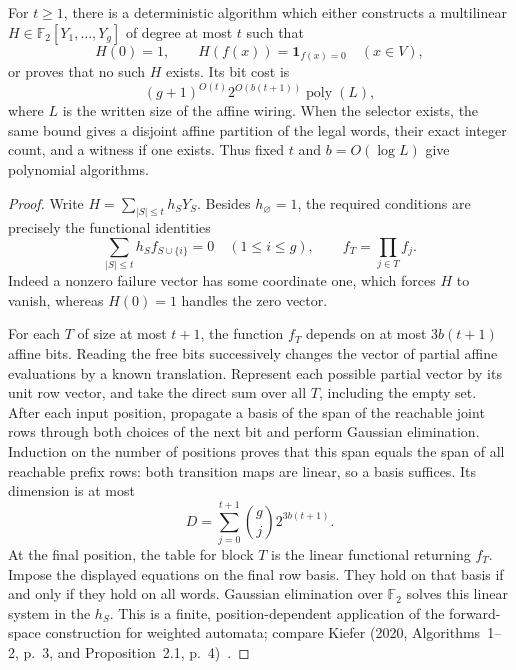 \begin{theorem}
\label{st:selector}
For $t\ge1$, there is a deterministic algorithm which either constructs a multilinear $H\in\mathbb F_2[Y_1,\ldots,Y_g]$ of degree at most $t$ such that
\[
 H(0)=1,\qquad H(f(x))=\mathbf1_{f(x)=0}\quad(x\in V),
\]
or proves that no such $H$ exists. Its bit cost is
\[
 (g+1)^{O(t)}2^{O(b(t+1))}\operatorname{poly}(L),
\]
where $L$ is the written size of the affine wiring. When the selector exists, the same bound gives a disjoint affine partition of the legal words, their exact integer count, and a witness if one exists. Thus fixed $t$ and $b=O(\log L)$ give polynomial algorithms.
\end{theorem}
\begin{proof}
Write $H=\sum_{|S|\le t}h_SY_S$. Besides $h_\varnothing=1$, the required conditions are precisely the functional identities
\[
 \sum_{|S|\le t}h_Sf_{S\cup\{i\}}=0\quad(1\le i\le g),
 \qquad f_T=\prod_{j\in T}f_j.
\]
Indeed a nonzero failure vector has some coordinate one, which forces $H$ to vanish, whereas $H(0)=1$ handles the zero vector.

For each $T$ of size at most $t+1$, the function $f_T$ depends on at most $3b(t+1)$ affine bits. Reading the free bits successively changes the vector of partial affine evaluations by a known translation. Represent each possible partial vector by its unit row vector, and take the direct sum over all $T$, including the empty set. After each input position, propagate a basis of the span of the reachable joint rows through both choices of the next bit and perform Gaussian elimination. Induction on the number of positions proves that this span equals the span of all reachable prefix rows: both transition maps are linear, so a basis suffices. Its dimension is at most
\[
 D=\sum_{j=0}^{t+1}\binom gj2^{3b(t+1)}.
\]
At the final position, the table for block $T$ is the linear functional returning $f_T$. Impose the displayed equations on the final row basis. They hold on that basis if and only if they hold on all words. Gaussian elimination over $\mathbb F_2$ solves this linear system in the $h_S$. This is a finite, position-dependent application of the forward-space construction for weighted automata; compare Kiefer (2020, Algorithms~1--2, p.~3, and Proposition~2.1, p.~4)~\cite{st-kiefer}.


\end{proof}
